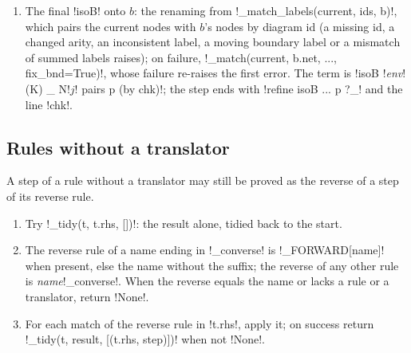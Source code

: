 {\begin{algorithm}
\begin{enumerate}
\item The final \lean!isoB! onto $b$: the renaming from \py!_match_labels(current, ids, b)!,
  which pairs the current nodes with $b$'s nodes by diagram id (a missing id, a changed arity, an
  inconsistent label, a moving boundary label or a mismatch of summed labels raises); on failure,
  \py!_match(current, b.net, ..., fix_bnd=True)!, whose failure re-raises the first error. The
  term is \code!isoB !\textit{env}\code! (K) _ N!$j$\code! pairs p (by chk)!; the step ends with
  \code!refine isoB ... p ?_! and the line \code!chk!.
\end{enumerate}
\end{algorithm}

\subsection{Rules without a translator}\label{sec:lean-export-net-forward}

A step of a rule without a translator may still be proved as the reverse of a step of its
reverse rule.

\begin{algorithm}\label{alg:lean-export-net-forward}
\begin{enumerate}
\item Try \py!_tidy(t, t.rhs, [])!: the result alone, tidied back to the start.
\item The reverse rule of a name ending in \code!_converse! is \py!_FORWARD[name]! when present,
  else the name without the suffix; the reverse of any other rule is \textit{name}\code!_converse!.
  When the reverse equals the name or lacks a rule or a translator, return \py!None!.
\item For each match of the reverse rule in \code!t.rhs!, apply it; on success return
  \py!_tidy(t, result, [(t.rhs, step)])! when not \py!None!.
\end{enumerate}
\end{algorithm}

}
